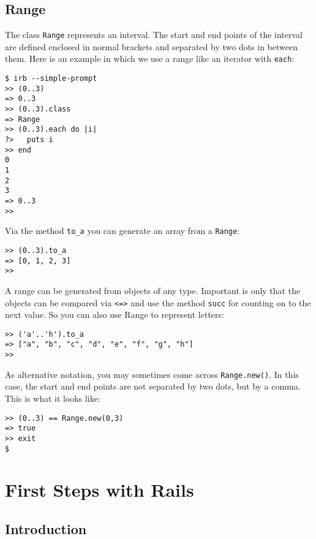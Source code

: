 \documentclass[a4paper]{book}
\newcommand{\chap}[1]{\newpage\thispagestyle{empty}\chapter{#1}\label{chap:\thechapter}}
\begin{document}
\section{Range}\label{range}

The class \texttt{Range} represents an interval. The start and end points of the interval are defined enclosed in normal brackets and separated by two dots in between them. Here is an example in which we use a range like an iterator with \texttt{each}:

\begin{shaded}\begin{verbatim}
$ irb --simple-prompt
>> (0..3)
=> 0..3
>> (0..3).class
=> Range
>> (0..3).each do |i|
?>   puts i
>> end
0
1
2
3
=> 0..3
>>
\end{verbatim}\end{shaded}

Via the method \texttt{to\_a} you can generate an array from a \texttt{Range}:

\begin{shaded}\begin{verbatim}
>> (0..3).to_a
=> [0, 1, 2, 3]
>>
\end{verbatim}\end{shaded}

A range can be generated from objects of any type. Important is only that the objects can be compared via \texttt{\textless{}=\textgreater{}} and use the method \texttt{succ} for counting on to the next value. So you can also use Range to represent letters:

\begin{shaded}\begin{verbatim}
>> ('a'..'h').to_a
=> ["a", "b", "c", "d", "e", "f", "g", "h"]
>>
\end{verbatim}\end{shaded}

As alternative notation, you may sometimes come across \texttt{Range.new()}. In this case, the start and end points are not separated by two dots, but by a comma. This is what it looks like:

\begin{shaded}\begin{verbatim}
>> (0..3) == Range.new(0,3)
=> true
>> exit
$
\end{verbatim}\end{shaded}

\chap{First Steps with Rails}\label{first-steps-with-rails}

\section{Introduction}\label{introduction}
\end{document}

